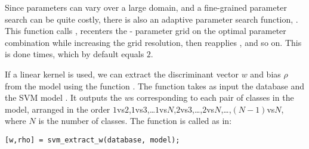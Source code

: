 \documentclass[twocolumn]{article}
\begin{document}
Since parameters can vary over a large domain, and a fine-grained parameter search can be quite costly, there is also an adaptive parameter search function, . This function calls , recenters the - parameter grid on the optimal parameter combination while increasing the grid resolution,  then reapplies , and so on. This is done  times, which by default equals $2$.

If a linear kernel is used, we can extract the discriminant vector $w$ and bias $\rho$ from the model using the function . The function takes as input the database  and the SVM model . It outputs the $w$s corresponding to each pair of classes in the model, arranged in the order $1$vs$2$,$1$vs$3$,\ldots$1$vs$N$,$2$vs$3$,\ldots,$2$vs$N$,\ldots,$(N-1)$vs$N$, where $N$ is the number of classes. The function is called as in:
\begin{lstlisting}
[w,rho] = svm_extract_w(database, model);
\end{lstlisting}
\end{document}
